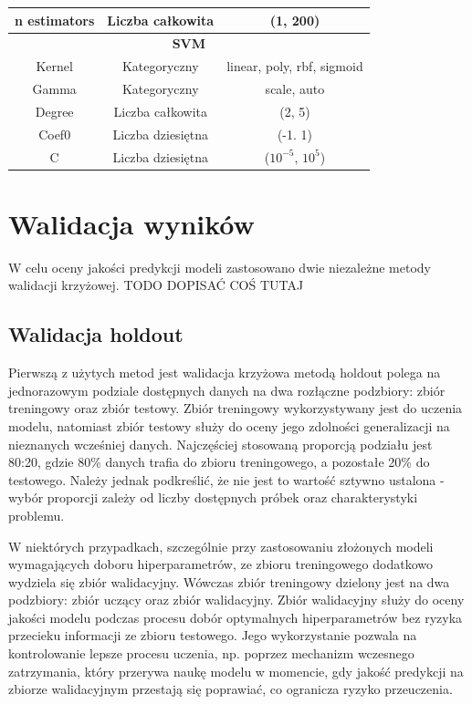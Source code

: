 \documentclass[a4paper,twoside,12pt]{book}
\begin{document}
\begin{table}[]
\begin{tabular}{@{}ccc@{}}
		n estimators           & Liczba całkowita  & (1, 200)                   \\ \midrule
		\multicolumn{3}{c}{\textbf{SVM}}                                        \\ \midrule
		Kernel                 & Kategoryczny      & linear, poly, rbf, sigmoid \\
		Gamma                  & Kategoryczny      & scale, auto                \\
		Degree                 & Liczba całkowita  & (2, 5)                     \\
		Coef0                  & Liczba dziesiętna & (-1. 1)                    \\
		C                      & Liczba dziesiętna & ($10^{-5}$,  $10^{5}$)     \\ \bottomrule
	\end{tabular}
\end{table}

\newpage
\section{Walidacja wyników}
W celu oceny jakości predykcji modeli zastosowano dwie niezależne metody walidacji krzyżowej. TODO DOPISAĆ COŚ TUTAJ\\



\subsection{Walidacja holdout}
Pierwszą z użytych metod jest walidacja krzyżowa metodą holdout polega na jednorazowym podziale dostępnych danych na dwa rozłączne podzbiory: zbiór treningowy oraz zbiór testowy. Zbiór treningowy wykorzystywany jest do uczenia modelu, natomiast zbiór testowy służy do oceny jego zdolności generalizacji na nieznanych wcześniej danych. Najczęściej stosowaną proporcją podziału jest 80:20, gdzie 80\% danych trafia do zbioru treningowego, a pozostałe 20\% do testowego. Należy jednak podkreślić, że nie jest to wartość sztywno ustalona - wybór proporcji zależy od liczby dostępnych próbek oraz charakterystyki problemu.

W niektórych przypadkach, szczególnie przy zastosowaniu złożonych modeli wymagających doboru hiperparametrów, ze zbioru treningowego dodatkowo wydziela się zbiór walidacyjny. Wówczas zbiór treningowy dzielony jest na dwa podzbiory: zbiór uczący oraz zbiór walidacyjny. Zbiór walidacyjny służy do oceny jakości modelu podczas procesu dobór optymalnych hiperparametrów bez ryzyka przecieku informacji ze zbioru testowego. Jego wykorzystanie pozwala na kontrolowanie lepsze procesu uczenia, np. poprzez mechanizm wczesnego zatrzymania, który przerywa naukę modelu w momencie, gdy jakość predykcji na zbiorze walidacyjnym przestają się poprawiać, co ogranicza ryzyko przeuczenia.\\
\end{document}
